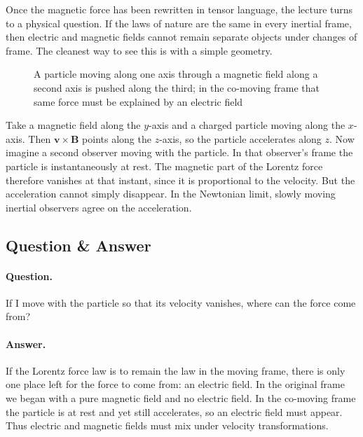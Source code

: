 Once the magnetic force has been rewritten in tensor language, the lecture turns to a physical question. If the laws of nature are the same in every inertial frame, then electric and magnetic fields cannot remain separate objects under changes of frame. The cleanest way to see this is with a simple geometry.

\begin{figure}
\centering
{}
\caption{A particle moving along one axis through a magnetic field along a second axis is pushed along the third; in the co-moving frame that same force must be explained by an electric field}
\end{figure}

Take a magnetic field along the \(y\)-axis and a charged particle moving along the \(x\)-axis. Then \(\mathbf v\times \mathbf B\) points along the \(z\)-axis, so the particle accelerates along \(z\). Now imagine a second observer moving with the particle. In that observer's frame the particle is instantaneously at rest. The magnetic part of the Lorentz force therefore vanishes at that instant, since it is proportional to the velocity. But the acceleration cannot simply disappear. In the Newtonian limit, slowly moving inertial observers agree on the acceleration.

\subsection{Question \& Answer}

\paragraph{Question.} If I move with the particle so that its velocity vanishes, where can the force come from?

\paragraph{Answer.} If the Lorentz force law is to remain the law in the moving frame, there is only one place left for the force to come from: an electric field. In the original frame we began with a pure magnetic field and no electric field. In the co-moving frame the particle is at rest and yet still accelerates, so an electric field must appear. Thus electric and magnetic fields must mix under velocity transformations.

